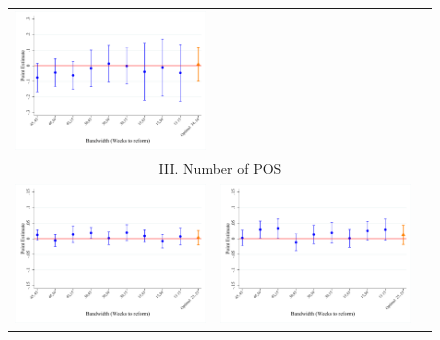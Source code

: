 \documentclass[12pt,notitlepage,a4paper]{article}
\begin{document}
\begin{landscape}
\begin{figure}[ht]
{\begin{tabular}{c c c }
\includegraphics[scale=.4]{output/robust_log_tot_sales_3_d_w_0815.pdf} \\
\multicolumn{3}{c}{III.  Number of POS} \\
\includegraphics[scale=.4]{output/robust_log_count_pos_total_1_d_w_0815.pdf} &
\includegraphics[scale=.4]{output/robust_log_count_pos_total_2_d_w_0815.pdf} &

\end{tabular}}
\end{figure}
\end{landscape}
\end{document}
